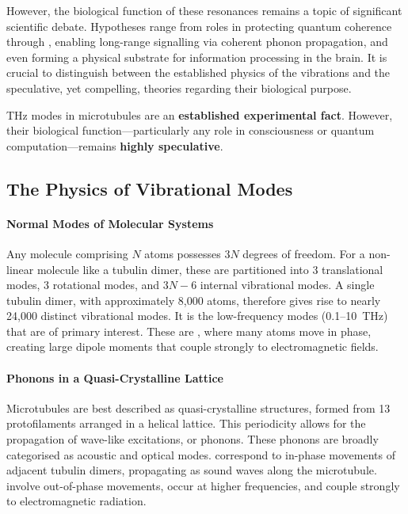However, the biological function of these resonances remains a topic of significant scientific debate. Hypotheses range from roles in protecting quantum coherence through , enabling long-range signalling via coherent phonon propagation, and even forming a physical substrate for information processing in the brain. It is crucial to distinguish between the established physics of the vibrations and the speculative, yet compelling, theories regarding their biological purpose.

\begin{keyconcept}
    THz modes in microtubules are an \textbf{established experimental fact}. However, their biological function—particularly any role in consciousness or quantum computation—remains \textbf{highly speculative}.
\end{keyconcept}

\subsection{The Physics of Vibrational Modes}

\paragraph{Normal Modes of Molecular Systems}
Any molecule comprising \(N\) atoms possesses \(3N\) degrees of freedom. For a non-linear molecule like a tubulin dimer, these are partitioned into 3 translational modes, 3 rotational modes, and \(3N-6\) internal vibrational modes. A single tubulin dimer, with approximately 8,000 atoms, therefore gives rise to nearly 24,000 distinct vibrational modes. It is the low-frequency modes (0.1--10~THz) that are of primary interest. These are , where many atoms move in phase, creating large dipole moments that couple strongly to electromagnetic fields.

\paragraph{Phonons in a Quasi-Crystalline Lattice}
Microtubules are best described as quasi-crystalline structures, formed from 13 protofilaments arranged in a helical lattice. This periodicity allows for the propagation of wave-like excitations, or phonons. These phonons are broadly categorised as acoustic and optical modes.  correspond to in-phase movements of adjacent tubulin dimers, propagating as sound waves along the microtubule.  involve out-of-phase movements, occur at higher frequencies, and couple strongly to electromagnetic radiation.

